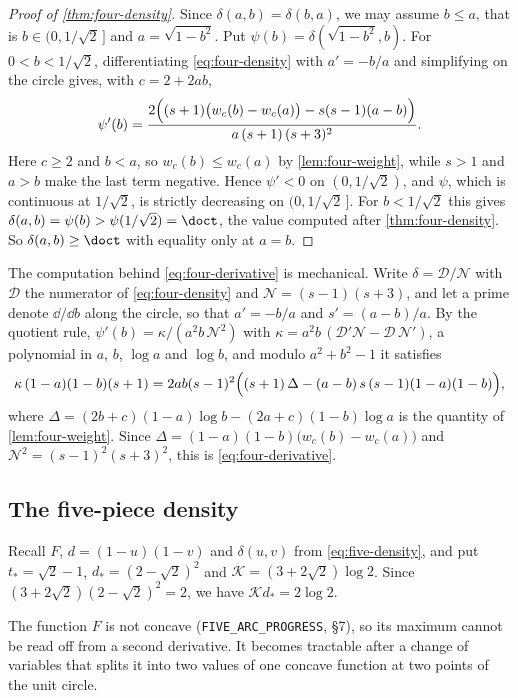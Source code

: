 \begin{proof}[Proof of \cref{thm:four-density}]
Since $\delta(a,b)=\delta(b,a)$, we may assume $b\le a$, that is $b\in(0,1/\sqrt2\,]$ and
$a=\sqrt{1-b^2}$. Put $\psi(b)=\delta(\sqrt{1-b^2},b)$. For $0<b<1/\sqrt2$, differentiating
\eqref{eq:four-density} with $a'=-b/a$ and simplifying on the circle gives, with $c=2+2ab$,
\begin{equation}\label{eq:four-derivative}
 \psi'(b)=\frac{2\Bigl((s+1)\bigl(w_c(b)-w_c(a)\bigr)-s(s-1)(a-b)\Bigr)}{a\,(s+1)\,(s+3)^2}.
\end{equation}
Here $c\ge2$ and $b<a$, so $w_c(b)\le w_c(a)$ by \cref{lem:four-weight}, while $s>1$ and $a>b$
make the last term negative. Hence $\psi'<0$ on $(0,1/\sqrt2)$, and $\psi$, which is continuous
at $1/\sqrt2$, is strictly decreasing on $(0,1/\sqrt2\,]$. For $b<1/\sqrt2$ this gives
$\delta(a,b)=\psi(b)>\psi(1/\sqrt2)=\doct$, the value computed after \cref{thm:four-density}.
So $\delta(a,b)\ge\doct$ with equality only at $a=b$.
\end{proof}

The computation behind \eqref{eq:four-derivative} is mechanical. Write $\delta=\mathcal D/\mathcal N$
with $\mathcal D$ the numerator of \eqref{eq:four-density} and $\mathcal N=(s-1)(s+3)$, and let a
prime denote $\dd/\dd b$ along the circle, so that $a'=-b/a$ and $s'=(a-b)/a$. By the quotient
rule, $\psi'(b)=\kappa/(a^2b\,\mathcal N^2)$ with $\kappa=a^2b\,(\mathcal D'\mathcal N-\mathcal D\,\mathcal N')$,
a polynomial in $a$, $b$, $\log a$ and $\log b$, and modulo $a^2+b^2-1$ it satisfies
\[
 \kappa\,(1-a)(1-b)(s+1)
 =2ab(s-1)^2\Bigl((s+1)\,\Delta-(a-b)\,s\,(s-1)(1-a)(1-b)\Bigr),
\]
where $\Delta=(2b+c)(1-a)\log b-(2a+c)(1-b)\log a$ is the quantity of \cref{lem:four-weight}.
Since $\Delta=(1-a)(1-b)\bigl(w_c(b)-w_c(a)\bigr)$ and $\mathcal N^2=(s-1)^2(s+3)^2$, this is
\eqref{eq:four-derivative}.

\subsection{The five-piece density}\label{app:five-density}

Recall $F$, $d=(1-u)(1-v)$ and $\delta(u,v)$ from \eqref{eq:five-density}, and put
$t_*=\sqrt2-1$, $d_*=(2-\sqrt2)^2$ and $\mathcal K=(3+2\sqrt2)\log2$. Since
$(3+2\sqrt2)(2-\sqrt2)^2=2$, we have $\mathcal K d_*=2\log2$.

The function $F$ is not concave (\texttt{FIVE\_ARC\_PROGRESS}, \S7), so its maximum cannot be
read off from a second derivative. It becomes tractable after a change of variables that splits
it into two values of one concave function at two points of the unit circle.

